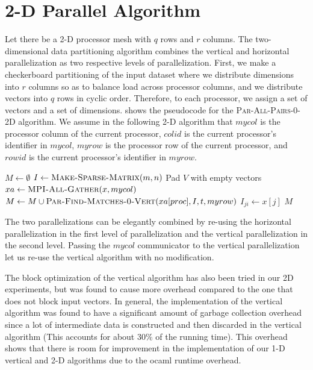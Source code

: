 \documentclass{comjnl}
\newcommand{\algo}[1]{\textsc{#1}} %
\begin{document}
\section{2-D Parallel Algorithm}
\label{sec:2dpar}

Let there be a 2-D processor mesh with $q$ rows and $r$ columns.  The
two-dimensional data partitioning algorithm combines the vertical
and horizontal parallelization as two respective levels of
parallelization. First, we make a checkerboard partitioning of the
input dataset where we distribute dimensions into $r$ columns so as to
balance load across processor columns, and we distribute vectors into
$q$ rows in cyclic order.  Therefore, to each processor, we assign a
set of vectors and a set of dimensions.
 shows the pseudocode for the
\algo{Par-All-Pairs-0-2D} algorithm. We assume in the following 2-D
algorithm that $mycol$ is the processor column of the current
processor, $colid$ is the current processor's identifier in $mycol$,
$myrow$ is the processor row of the current processor, and $rowid$ is
the current processor's identifier in $myrow$.

\begin{algorithm}
  \caption{$\algo{Par-All-Pairs-0-2D}(V,t)$}
  \label{alg:par-all-pairs-2d}
  \begin{algorithmic}
    \STATE $M \gets \emptyset$ 
    \STATE $I \gets \algo{Make-Sparse-Matrix}(m, n)$ 
    \STATE Pad $V$ with empty vectors
       \STATE $xa \gets \algo{MPI-All-Gather}(x, mycol)$ 
         \STATE $M \gets M \cup \algo{Par-Find-Matches-0-Vert}
         \linebreak (xa[proc], I, t, 
    myrow)$ 
             \STATE $I_{ji} \gets x[j]$
           \ENDFOR
         \ENDIF
      \ENDFOR
    \ENDFOR
    \RETURN $M$
  \end{algorithmic}
\end{algorithm}

The two parallelizations can be elegantly combined by re-using the
horizontal parallelization in the first level of parallelization and
the vertical parallelization in the second level. Passing the $mycol$
communicator to the vertical parallelization let us re-use the
vertical algorithm with no modification.

The block optimization of the vertical algorithm has also been tried
in our 2D experiments, but was found to cause more overhead compared
to the one that does not block input vectors.  In general, the
implementation of the vertical algorithm was found to have a
significant amount of garbage collection overhead since a lot of
intermediate data is constructed and then discarded in the vertical
algorithm (This accounts for about $30\%$ of the running time). This
overhead shows that there is room for improvement in the
implementation of our 1-D vertical and 2-D algorithms due to the
ocaml runtime overhead.
\end{document}
